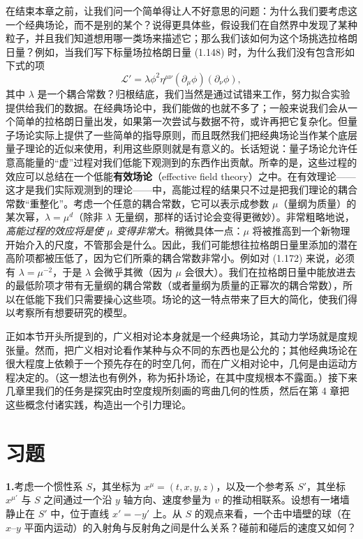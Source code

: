 在结束本章之前，让我们问一个简单得让人不好意思的问题：为什么我们要考虑这一个经典场论，而不是别的某个？说得更具体些，假设我们在自然界中发现了某种粒子，并且我们知道想用哪一类场来描述它；那么我们该如何为这个场挑选拉格朗日量？例如，当我们写下标量场拉格朗日量 (1.148) 时，为什么我们没有包含形如下式的项
\begin{equation*}
\mathcal{L}' = \lambda\phi^{2}\eta^{\mu\nu}(\partial_{\mu}\phi)(\partial_{\nu}\phi),
\tag{1.172}
\end{equation*}
其中 $\lambda$ 是一个耦合常数？归根结底，我们当然是通过试错来工作，努力拟合实验提供给我们的数据。在经典场论中，我们能做的也就不多了；一般来说我们会从一个简单的拉格朗日量出发，如果第一次尝试与数据不符，或许再把它复杂化。但量子场论实际上提供了一些简单的指导原则，而且既然我们把经典场论当作某个底层量子理论的近似来使用，利用这些原则就是有意义的。长话短说：量子场论允许任意高能量的“虚”过程对我们低能下观测到的东西作出贡献。所幸的是，这些过程的效应可以总结在一个低能\textbf{有效场论}（effective field theory）之中。在有效理论——这才是我们实际观测到的理论——中，高能过程的结果只不过是把我们理论的耦合常数“重整化”。考虑一个任意的耦合常数，它可以表示成参数 $\mu$（量纲为质量）的某次幂，$\lambda=\mu^{d}$（除非 $\lambda$ 无量纲，那样的话讨论会变得更微妙）。非常粗略地说，\emph{高能过程的效应将是使 $\mu$ 变得非常大。}稍微具体一点：$\mu$ 将被推高到一个新物理开始介入的尺度，不管那会是什么。因此，我们可能想往拉格朗日量里添加的潜在高阶项都被压低了，因为它们所乘的耦合常数非常小。例如对 (1.172) 来说，必须有 $\lambda=\mu^{-2}$，于是 $\lambda$ 会微乎其微（因为 $\mu$ 会很大）。我们在拉格朗日量中能放进去的最低阶项才带有无量纲的耦合常数（或者量纲为质量的正幂次的耦合常数），所以在低能下我们只需要操心这些项。场论的这一特点带来了巨大的简化，使我们得以考察所有想要研究的模型。

正如本节开头所提到的，广义相对论本身就是一个经典场论，其动力学场就是度规张量。然而，把广义相对论看作某种与众不同的东西也是公允的；其他经典场论在很大程度上依赖于一个预先存在的时空几何，而在广义相对论中，几何是由运动方程决定的。（这一想法也有例外，称为拓扑场论，在其中度规根本不露面。）接下来几章里我们的任务是探究由时空度规所刻画的弯曲几何的性质，然后在第 4 章把这些概念付诸实践，构造出一个引力理论。

\section{习题}

\textbf{1.}\quad 考虑一个惯性系 $S$，其坐标为 $x^{\mu}=(t,x,y,z)$，以及一个参考系 $S'$，其坐标 $x^{\mu'}$ 与 $S$ 之间通过一个沿 $y$ 轴方向、速度参量为 $v$ 的推动相联系。设想有一堵墙静止在 $S'$ 中，位于直线 $x'=-y'$ 上。从 $S$ 的观点来看，一个击中墙壁的球（在 $x$--$y$ 平面内运动）的入射角与反射角之间是什么关系？碰前和碰后的速度又如何？

